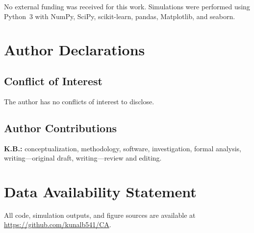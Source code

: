 \documentclass[aip,cha,preprint,nofootinbib]{revtex4-2}
\begin{document}
\begin{acknowledgments}
No external funding was received for this work.
Simulations were performed using Python~3 with NumPy, SciPy, scikit-learn,
pandas, Matplotlib, and seaborn.
\end{acknowledgments}

\section*{Author Declarations}

\subsection*{Conflict of Interest}
The author has no conflicts of interest to disclose.

\subsection*{Author Contributions}
\textbf{K.B.:} conceptualization, methodology, software, investigation,
formal analysis, writing---original draft, writing---review and editing.

\section*{Data Availability Statement}

All code, simulation outputs, and figure sources are available at
\url{https://github.com/kunalb541/CA}.
\end{document}
